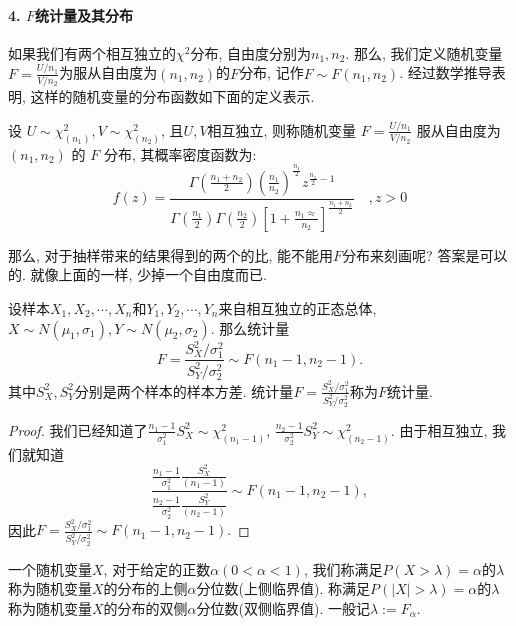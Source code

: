 \paragraph{4. $F$统计量及其分布} 如果我们有两个相互独立的$\chi^2$分布, 自由度分别为$n_1, n_2$. 那么, 我们定义随机变量$F=\frac{U/n_1}{V/n_2}$为服从自由度为$(n_1, n_2)$的$F$分布, 记作$F\sim F(n_1, n_2)$. 经过数学推导表明, 这样的随机变量的分布函数如下面的定义表示. 

\begin{definition}
    设 $U \sim \chi^2_{\left(n_1\right)}, V \sim \chi^2_{\left(n_2\right)}$, 且$U,V$相互独立, 则称随机变量 $F=\frac{U / n_1}{V / n_2}$ 服从自由度为 $\left(n_1, n_2\right)$ 的 ${F}$ 分布, 其概率密度函数为:
$$
f(z)=\frac{\Gamma\left(\frac{n_1+n_2}{2}\right)\left(\frac{n_1}{n_2}\right)^{\frac{n_1}{2}} z^{\frac{n_1}{2}-1}}{\Gamma\left(\frac{n_1}{2}\right) \Gamma\left(\frac{n_2}{2}\right)\left[1+\frac{n_1 \approx}{n_2}\right]^{\frac{n_1+n_2}{2}}} \quad ,z>0
$$
\end{definition}

那么, 对于抽样带来的结果得到的两个的比, 能不能用$F$分布来刻画呢? 答案是可以的. 就像上面的一样, 少掉一个自由度而已. 

\begin{corollary}
    设样本$X_1, X_2,\cdots, X_n$和$Y_1, Y_2, \cdots, Y_n$来自相互独立的正态总体, $X\sim N(\mu_1, \sigma_1), Y\sim N(\mu_2, \sigma_2)$. 那么统计量
    \[
        F=\frac{S_X^2/\sigma_1^2}{S_Y^2/\sigma_2^2} \sim F(n_1-1, n_2-1).
    \]
    其中$S_X^2, S_Y^2$分别是两个样本的样本方差. 统计量$F=\frac{S_X^2/\sigma_1^2}{S_Y^2/\sigma_2^2}$称为$F$统计量. 
\end{corollary}

\begin{proof}
    我们已经知道了$\frac{n_1-1}{\sigma_1^2}S_X^2\sim \chi^2_{(n_1-1)}$, $\frac{n_2-1}{\sigma_2^2}S_Y^2\sim \chi^2_{(n_2-1)}$. 由于相互独立, 我们就知道
    \[
        \frac{
            \frac{
                n_1-1
            }{\sigma_1^2}
            \frac{S_X^2}{(n_1-1)}
        }{
            \frac{
                n_2-1
            }{\sigma_2^2}
            \frac{
                S_Y^2
            }{(n_2-1)}
        }\sim F(n_1-1, n_2-1),  
    \]
    因此$ F=\frac{S_X^2/\sigma_1^2}{S_Y^2/\sigma_2^2} \sim F(n_1-1, n_2-1).$
\end{proof}


\begin{definition}[分位数]
    一个随机变量$X$, 对于给定的正数$\alpha(0< \alpha<1 )$, 我们称满足$P(X>\lambda)=\alpha$的$\lambda$称为随机变量$X$的分布的上侧$\alpha$分位数(上侧临界值). 称满足$P(|X|>\lambda)=\alpha$的$\lambda$称为随机变量$X$的分布的双侧$\alpha$分位数(双侧临界值). 一般记$\lambda:=F_{\alpha}$. 
\end{definition}

